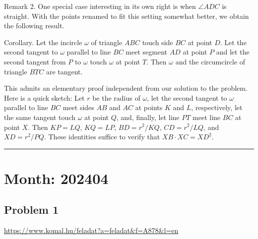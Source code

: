 \documentclass{article}
\begin{document}
Remark 2. One special case interesting in its own right is when \(\displaystyle \angle ADC\) is straight. With the points renamed to fit this setting somewhat better, we obtain the following result.

Corollary. Let the incircle \(\displaystyle \omega\) of triangle \(\displaystyle ABC\) touch side \(\displaystyle BC\) at point \(\displaystyle D\). Let the second tangent to \(\displaystyle \omega\) parallel to line \(\displaystyle BC\) meet segment \(\displaystyle AD\) at point \(\displaystyle P\) and let the second tangent from \(\displaystyle P\) to \(\displaystyle \omega\) touch \(\displaystyle \omega\) at point \(\displaystyle T\). Then \(\displaystyle \omega\) and the circumcircle of triangle \(\displaystyle BTC\) are tangent.

This admits an elementary proof independent from our solution to the problem. Here is a quick sketch: Let \(\displaystyle r\) be the radius of \(\displaystyle \omega\), let the second tangent to \(\displaystyle \omega\) parallel to line \(\displaystyle BC\) meet sides \(\displaystyle AB\) and \(\displaystyle AC\) at points \(\displaystyle K\) and \(\displaystyle L\), respectively, let the same tangent touch \(\displaystyle \omega\) at point \(\displaystyle Q\), and, finally, let line \(\displaystyle PT\) meet line \(\displaystyle BC\) at point \(\displaystyle X\). Then \(\displaystyle KP = LQ\), \(\displaystyle KQ = LP\), \(\displaystyle BD = r^2/KQ\), \(\displaystyle CD = r^2/LQ\), and \(\displaystyle XD = r^2/PQ\). These identities suffice to verify that \(\displaystyle XB \cdot XC = XD^2\).

\vspace{1em}
\hrule
\vspace{1em}

\section*{Month: 202404}

\subsection*{Problem 1}
\noindent\url{https://www.komal.hu/feladat?a=feladat&f=A878&l=en}\\[1em]
\end{document}
